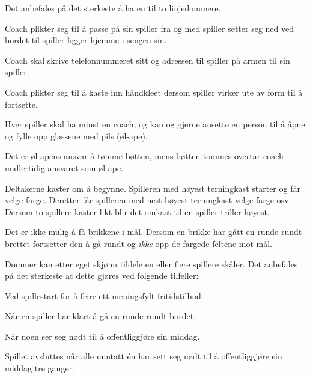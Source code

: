 \documentclass[10pt,a4paper,norsk,openany]{book}
\begin{document}
\begin{hus}
\item \label{sec:hus} Det anbefales på det sterkeste å ha en til to
  linjedommere.

\item Coach plikter seg til å passe på sin spiller fra og med spiller setter seg
  ned ved bordet til spiller ligger hjemme i sengen sin.

\item Coach skal skrive telefonnummeret sitt og adressen til spiller på armen
  til sin spiller.

  \item Coach plikter seg til å kaste inn håndkleet dersom spiller virker ute av
    form til å fortsette. 

\item \label{sec:hus-coach} Hver spiller skal ha minst en coach, og kan og
  gjerne ansette en person til å åpne og fylle opp glassene med pils (øl-ape).

  \item Det er øl-apens ansvar å tømme bøtten, mens bøtten tommes overtar coach
    midlertidig ansvaret som øl-ape.
    
\item \label{par:hus-start} Deltakerne kaster om å begynne. Spilleren med høyest
  terningkast starter og får velge farge. Deretter får spilleren med nest høyest
  terningkast velge farge osv. Dersom to spillere kaster likt blir det omkast
  til en spiller triller høyest.
    
\item \label{par:hus-hjem} Det er ikke mulig å få brikkene i mål. Dersom en
  brikke har gått en runde rundt brettet fortsetter den å gå rundt og
  \emph{ikke} opp de fargede feltene mot mål.
    
\item Dommer kan etter eget skjønn tildele en eller flere spillere skåler. Det
  anbefales på det sterkeste at dette gjøres ved følgende tilfeller:
    
    \begin{hus}
    \item Ved spillestart for å feire ett meningsfylt fritidstilbud.
      
    \item Når en spiller har klart å gå en runde rundt bordet.
      
    \item Når noen ser seg nødt til å offentliggjøre sin middag.
    \end{hus}
      
  \item \label{par:hus-avsluttes} Spillet avsluttes når alle unntatt én har sett
    seg nødt til å offentliggjøre sin middag tre ganger.
\end{hus}
\end{document}
